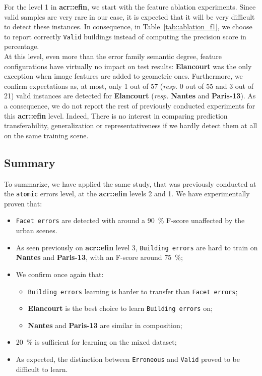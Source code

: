         For the level 1 in \textbf{\gls{acr::efin}}, we start with the feature ablation experiments.
        Since valid samples are very rare in our case, it is expected that it will be very difficult to detect these instances.
        In consequence, in Table~\ref{tab::ablation_f1}, we choose to report correctly \texttt{Valid} buildings instead of computing the precision score in percentage.\\
            
        At this level, even more than the error family semantic degree, feature configurations have virtually no impact on test results: \textbf{Elancourt} was the only exception when image features are added to geometric ones.
        Furthermore, we confirm expectations as, at most, only 1 out of 57 (\textit{resp.} 0 out of 55 and 3 out of 21) valid instances are detected for \textbf{Elancourt} (\textit{resp.} \textbf{Nantes} and \textbf{Paris-13}).
        As a consequence, we do not report the rest of previously conducted experiments for this \textbf{\gls{acr::efin}} level.
        Indeed, There is no interest in comparing prediction transferability, generalization or representativeness if we hardly detect them at all on the same training scene.

    \subsection{Summary}
        \label{subsec::experiments::finesse::summary}
        To summarize, we have applied the same study, that was previously conducted at the \texttt{atomic} errors level, at the \textbf{\gls{acr::efin}} levels 2 and 1.
        We have experimentally proven that:
        \begin{itemize}[label=\(\blacktriangleright\)]
            \item \texttt{Facet errors} are detected with around a \SI{90}{\percent} F-score unaffected by the urban scenes.
            \item As seen previously on \textbf{\gls{acr::efin}} level 3, \texttt{Building errors} are hard to train on \textbf{Nantes} and \textbf{Paris-13}, with an F-score around \SI{75}{\percent};
            \item We confirm once again that:
            \begin{itemize}[label=\(\blacktriangleright\)]
                \item \texttt{Building errors} learning is harder to transfer than \texttt{Facet errors};
                \item \textbf{Elancourt} is the best choice to learn \texttt{Building errors} on;
                \item \textbf{Nantes} and \textbf{Paris-13} are similar in composition;
            \end{itemize}
            \item \SI{20}{\percent} is sufficient for learning on the mixed dataset;
            \item As expected, the distinction between \texttt{Erroneous} and \texttt{Valid} proved to be difficult to learn.
        \end{itemize}
